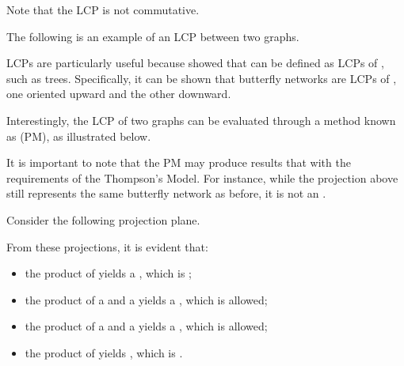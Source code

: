 \documentclass[a4paper, 12pt]{report}
\begin{document}
    Note that the LCP is not commutative.

    \begin{example}[LCPs]
        The following is an example of an LCP between two graphs.
        
    \end{example}

    LCPs are particularly useful because \textcite{evenlitman} showed that  can be defined as LCPs of , such as trees. Specifically, it can be shown that butterfly networks are LCPs of , one oriented upward and the other downward.


    Interestingly, the LCP of two graphs can be evaluated through a method known as  (PM), as illustrated below.


    It is important to note that the PM may produce results that  with the requirements of the Thompson's Model. For instance, while the projection above still represents the same butterfly network as before, it is not an .

    Consider the following projection plane.

    
    From these projections, it is evident that:

    \begin{itemize}
        \item the product of  yields a , which is ;
        \item the product of a  and a  yields a , which is allowed;
        \item the product of a  and a  yields a , which is allowed;
        \item the product of  yields , which is .
    \end{itemize}
\end{document}
